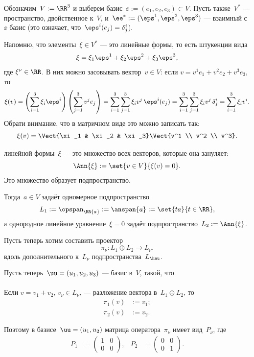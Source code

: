 \begin{proofm}
	Обозначим~$V := \RR^3$ и выберем базис~$\ee := (e_1, e_2, e_3) \subset V$. Пусть также~$V^*$ --- пространство, двойственное к~$V$, и~$\ee^* := (\eps^1, \eps^2, \eps^3)$ --- взаимный с~$\ee$ базис (это означает, что~$\eps^i(e_j) = \delta^i_j$).

	Напомню, что элементы~$\xi \in V^*$ --- это линейные формы, то есть штукенции вида
	\[
		\xi = \xi_1 \eps^1 + \xi_2 \eps^2 + \xi_3 \eps^3
		,
	\]
	где $\xi^\nu \in \RR$. В них можно засовывать вектор~$v \in V$: если $v = v^1 e_1 + v^2 e_2 + v^3 e_3$, то
	\[
		\xi(v) =
		\left( 
			\sum_{i = 1}^3
				\xi_i \eps^i
		\right)
		\left( 
			\sum_{j = 1}^3
				v^j e_j
		\right)
		=
		\sum_{i = 1}^3
		\sum_{j = 1}^3
			\xi_i v^j\,\eps^i(e_j)
		=
		\sum_{i = 1}^3
		\sum_{j = 1}^3
			\xi_i v^j\,\delta^i_j
		=
		\sum_{i = 1}^3
			\xi_i v^i
		.
	\]
	Обрати внимание, что в матричном виде это можно записать так:
	\[
		\xi(v) =
		\Vect{\xi_1 & \xi_2 & \xi_3}
		\Vect{v^1 \\ v^2 \\ v^3}
		.
	\]

	\begin{definition}
		 линейной формы~$\xi$ --- это множество всех векторов, которые она зануляет:
		\[
			\Ann{\xi} :=
			\set{v \in V}{\xi(v) = 0}
			.
		\]
		Это множество образует подпространство.
	\end{definition}

	Тогда~$a \in V$ задаёт одномерное подпространство
	\[
		L_1 :=
		\opspan_\RR{a} :=
		\anspan{a} :=
		\set{ta}{t \in \RR},
	\]
	а однородное линейное уравнение~$\xi = 0$ задаёт подпространство~$L_2 := \Ann{\xi}$.

	Пусть теперь хотим составить проектор
	\[
		\pi_\nu \colon L_1 \oplus L_2 \to L_\nu
		.
	\]
	вдоль дополнительного к~$L_\nu$ подпространства~$L_{\hnu}$.
	
	Пусть теперь~$\uu = (u_1, u_2, u_3)$ --- базис в~$V$, такой, что
	\begin{align*}
	\end{align*}

	Если $v = v_1 + v_2$, $v_\nu \in L_\nu$, --- разложение вектора в~$L_1 \oplus L_2$, то
	\begin{align*}
		\pi_1(v) &:= v_1;
		\\
		\pi_2(v) &:= v_2.
	\end{align*}

	Поэтому в базисе~$\uu = (u_1, u_2)$ матрица оператора~$\pi_\nu$ имеет вид~$P_\nu$, где
	\begin{align*}
		P_1 &=
		\begin{pmatrix}
			1 & 0
			\\
			0 & 0
		\end{pmatrix}
		,
		&
		P_2 &=
		\begin{pmatrix}
			0 & 0
			\\
			0 & 1
		\end{pmatrix}
		.
	\end{align*}




\end{proofm}
